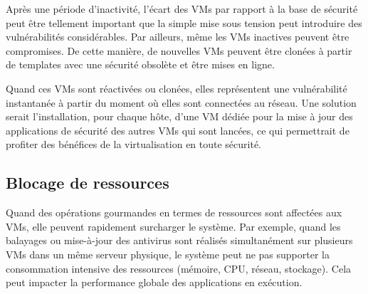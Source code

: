 Après une période d'inactivité, l'écart des VMs par rapport à la base de sécurité peut être tellement important que la simple mise sous tension peut introduire des vulnérabilités considérables. Par ailleurs, même les VMs inactives peuvent être compromises. De cette manière, de nouvelles VMs peuvent être clonées à partir de templates avec une sécurité obsolète et être mises en ligne.

Quand ces VMs sont réactivées ou clonées, elles représentent une vulnérabilité instantanée à partir du moment où elles sont connectées au réseau. Une solution serait l'installation,  pour chaque hôte, d'une VM dédiée pour la mise à jour des applications de sécurité des autres VMs qui sont lancées, ce qui permettrait de profiter des bénéfices de la virtualisation en toute sécurité. 

\subsection{Blocage de ressources}

Quand des opérations gourmandes en termes de ressources sont affectées aux VMs, elle peuvent rapidement surcharger le système. Par exemple, quand les balayages ou mise-à-jour des antivirus sont réalisés simultanément sur plusieurs VMs dans un même serveur physique, le système peut ne pas supporter la consommation intensive des ressources (mémoire, CPU, réseau, stockage). Cela peut impacter la performance globale des applications en exécution.

